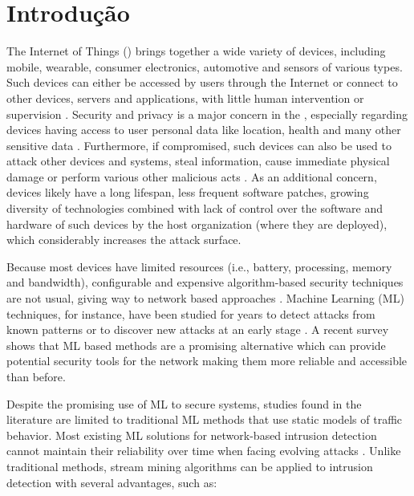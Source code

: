 
\chapter{Introdução}\label{cha:intro}

The Internet of Things (\iot) brings together a wide variety of devices,
including mobile, wearable, consumer electronics, automotive and sensors of
various types.
% 
Such devices can either be accessed by users through the Internet or connect
to other devices, servers and applications,
with little human intervention or supervision
\cite{Tahsien2020,abane2019,haddadpajouh2019survey,Shanbhag2015}.
% 
Security and privacy is a major concern in the \iot, especially regarding
devices having access to user personal data like
location, health and many other sensitive data \cite{sengupta2020comprehensive}.
% 
Furthermore, if compromised, such devices can also be used to attack other
devices and systems, steal information, cause immediate physical damage or
perform various other malicious acts \cite{Kolias2017mirai}.
% 
As an additional concern, \iot devices likely have a long lifespan, less frequent
software patches, growing diversity of technologies combined with lack of
control over the software and hardware of such devices by the host organization
(where they are deployed), which considerably increases the attack surface.

Because most \iot devices have limited resources (i.e., battery, processing,
memory and bandwidth), configurable and expensive algorithm-based
security techniques are not usual, giving way to network based approaches 
\cite{Zhou2017}.
Machine Learning (ML) techniques, for instance, have been studied for years to detect attacks
from known patterns or to discover new attacks at an early stage
\cite{buczak2016survey,mitchell2014survey}.
A recent survey \cite{Tahsien2020} shows that ML based methods are a
promising alternative which can provide potential security tools for the \iot
network making them more reliable and accessible than before.

Despite the promising use of ML to secure \iot systems, studies found in the
literature \cite{buczak2016survey,mitchell2014survey,Tahsien2020} are limited to
traditional ML methods that use static models of traffic behavior.
Most existing ML solutions for network-based intrusion detection cannot maintain
their reliability over time when facing evolving attacks \cite{Viegas2019,AndreoniLopez2019}.
Unlike traditional methods, stream mining algorithms can be applied to intrusion
detection with several advantages, such as:


